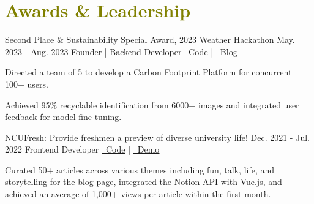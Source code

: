 

\section{\textcolor{olive}{\textbf{Awards \& Leadership}}}
    \resumeSubHeadingListStart
        
    \resumeSubheading
        {Second Place \& Sustainability Special Award, 2023 Weather Hackathon} %
        {May. 2023 - Aug. 2023} %
        {Founder | Backend Developer} %
        {
            \href{https://github.com/Weather-Shakespeare}{\underline{\faGithub\ Code}} 
            |
            \href{https://weather-shakespeare.github.io/}{\underline{\faBook\ Blog}} 
        } %

        \vspace{-1.0mm}

        \resumeItemListStart
        \item {Directed a team of 5 to develop a {Carbon Footprint Platform} for concurrent {100+} users.}
        \item {Achieved {95\%} recyclable identification from {6000+} images and integrated user feedback for model {fine tuning}.}
        \resumeItemListEnd

    \vspace{-2.0mm}

    \resumeSubheading
        {NCUFresh: Provide freshmen a preview of diverse university life!} %
        {Dec. 2021 - Jul. 2022} %
        {Frontend Developer} %
        {
            \href{https://github.com/ncufresh}{\underline{\faGithub\ Code}} 
            |
            \href{https://ncufresh.ncu.edu.tw/}{\underline{\faBook\ Demo}} 
        } %

        \vspace{-1.0mm}

        \resumeItemListStart
            \item {Curated {50+} articles across various themes including fun, talk, life, and storytelling for the blog page, {integrated the Notion API with Vue.js}, and achieved an average of {1,000+ views} per article within the first month.}
        \resumeItemListEnd

    \resumeSubHeadingListEnd
